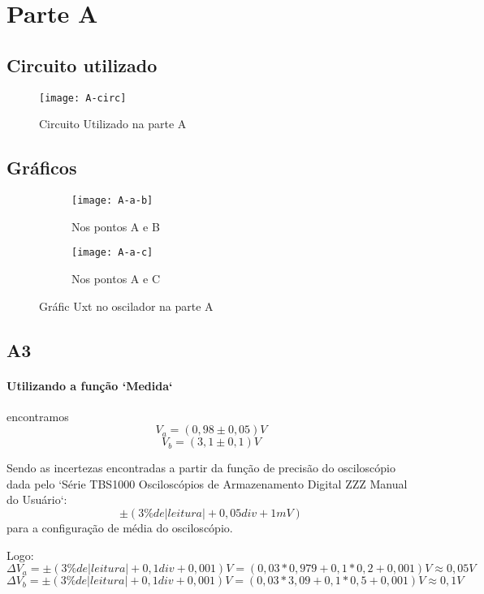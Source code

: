 \section{Parte A}
    \subsection{Circuito utilizado}
        \begin{figure} [H] 
            \texttt{[image: A-circ]}
            \caption{Circuito Utilizado na parte A}
            \label{fig:A-circ}
        \end{figure}
    \subsection{Gráficos}
        \begin{figure} [H] 
            \begin{subfigure}[b]{7cm}  
                \texttt{[image: A-a-b]}
                \caption{Nos pontos A e B}
                \label{fig:A-a-b}
            \end{subfigure}
            \begin{subfigure}[b]{7cm}  
                \texttt{[image: A-a-c]}
                \caption{Nos pontos A e C}
                \label{fig:A-a-c}
            \end{subfigure}
            \caption{Gráfic Uxt no oscilador na parte A}
        \end{figure}
    \subsection{A3}
        \paragraph{Utilizando a função `Medida`} encontramos 
        $$V_a = (0,98 \pm 0,05) V$$
        $$V_b = (3,1 \pm 0,1) V$$

        Sendo as incertezas encontradas a partir da função de precisão do osciloscópio dada pelo `Série TBS1000 Osciloscópios de Armazenamento Digital ZZZ Manual do Usuário`:
        $$\pm(3\% de |leitura| + 0,05 div + 1mV)$$
        para a configuração de média do osciloscópio. 
        \newline
        
        Logo:
        $$\Delta V_a = \pm(3\% de |leitura| + 0,1 div + 0,001) V = (0,03*0,979 + 0,1*0,2 + 0,001) V \approx 0,05 V$$
        $$\Delta V_b = \pm(3\% de |leitura| + 0,1 div + 0,001) V = (0,03*3,09 + 0,1*0,5 + 0,001) V \approx 0,1 V$$

